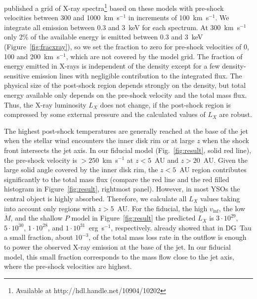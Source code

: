 \documentclass{emulateapj}
\begin{document}
\citet{2011AN....332..448G} published a grid of X-ray spectra\footnote{Available at http://hdl.handle.net/10904/10202} based on these models with pre-shock velocities between 300 and 1000~km~s$^{-1}$ in increments of 100~km~s$^{-1}$. We integrate all emission between 0.3 and 3~keV for each spectrum. At 300~km~s$^{-1}$ only 2\% of the available energy is emitted between 0.3 and 3~keV (Figure~\ref{fig:fracxray}), so we set the fraction to zero for pre-shock velocities of 0, 100 and 200~km~s$^{-1}$, which are not covered by the model grid. The fraction of energy emitted in X-rays is independent of the density except for a few density-sensitive emission lines with negligible contribution to the integrated flux. The physical size of the post-shock region depends strongly on the density, but total energy available only depends on the pre-shock velocity and the total mass flux. Thus, the X-ray luminosity $L_X$ does not change, if the post-shock region is compressed by some external pressure and the calculated values of $L_X$ are robust.

The highest post-shock temperatures are generally reached at the base of the jet when the stellar wind encounters the inner disk rim or at large $z$ when the shock front intersects the jet axis. In our fiducial model (Fig.~\ref{fig:result}, solid red line), the pre-shock velocity is $>250$~km~s$^{-1}$ at $z<5$~AU and $z>20$~AU. Given the large solid angle covered by the inner disk rim, the  $z<5$~AU region contributes significantly to the total mass flux (compare the red line and the red filled histogram in Figure~\ref{fig:result}, rightmost panel). However, in most YSOs the central object is highly absorbed. Therefore, we calculate all $L_X$ values taking into account only regions with  $z>5$~AU. For the fiducial, the high $v_\inf$, the low $\dot M$, and the shallow $P$ model in Figure~\ref{fig:result} the predicted $L_X$ is $3\cdot10^{29}$, $5\cdot10^{30}$, $1\cdot10^{28}$, and $1\cdot10^{31}$~erg~s$^{-1}$, respectively.
\citet{2009A&A...493..579G} already showed that in DG~Tau a small fraction, about $10^{-3}$, of the total mass loss rate in the outflow is enough to power the observed X-ray emission at the base of the jet. In our fiducial model, this small fraction corresponds to the mass flow close to the jet axis, where the pre-shock velocities are highest.
\end{document}
